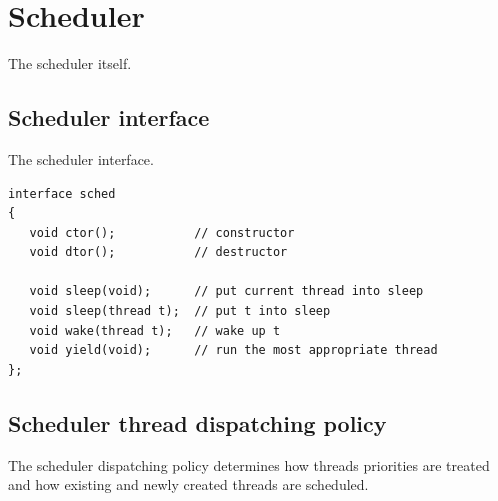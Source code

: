 \documentclass[onecolumn]{article}
\begin{document}
\section{Scheduler}
\label{sec-sched}

\par The scheduler itself.


\subsection{Scheduler interface}
\label{sec-sched-interface}

\par The scheduler interface.

\small
\begin{verbatim}
interface sched
{
   void ctor();           // constructor
   void dtor();           // destructor

   void sleep(void);      // put current thread into sleep
   void sleep(thread t);  // put t into sleep
   void wake(thread t);   // wake up t
   void yield(void);      // run the most appropriate thread
};
\end{verbatim}
\normalsize


\subsection{Scheduler thread dispatching policy}
\label{sec-sched-dispatch}

\par The scheduler dispatching policy determines how threads priorities are treated and how existing
and newly created threads are scheduled.
\end{document}
